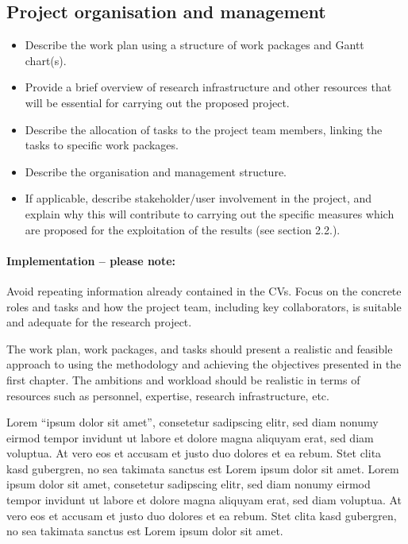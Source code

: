 \documentclass[11pt,a4paper,british]{article}
\begin{document}
\subsection{Project organisation and management}
\begin{itemize}
    \item Describe the work plan using a structure of work packages and Gantt
        chart(s).
    \item Provide a brief overview of research infrastructure and other
        resources that will be essential for carrying out the proposed project.
    \item Describe the allocation of tasks to the project team members, linking
        the tasks to specific work packages.
    \item Describe the organisation and management structure.
    \item If applicable, describe stakeholder/user involvement in the project,
        and explain why this will contribute to carrying out the specific
        measures which are proposed for the exploitation of the results (see
        section 2.2.).
\end{itemize}

\paragraph{Implementation -- please note:}
Avoid repeating information already contained in the CVs. Focus on the concrete
roles and tasks and how the project team, including key collaborators, is
suitable and adequate for the research project.

The work plan, work packages, and tasks should present a realistic and feasible
approach to using the methodology and achieving the objectives presented in the
first chapter. The ambitions and workload should be realistic in terms of
resources such as personnel, expertise, research infrastructure, etc.

\newpage
Lorem \enquote{ipsum dolor sit amet}, consetetur sadipscing elitr, sed diam nonumy eirmod tempor invidunt ut labore et dolore magna aliquyam erat, sed diam voluptua. At vero eos et accusam et justo duo dolores et ea rebum. Stet clita kasd gubergren, no sea takimata sanctus est Lorem ipsum dolor sit amet. Lorem ipsum dolor sit amet, consetetur sadipscing elitr, sed diam nonumy eirmod tempor invidunt ut labore et dolore magna aliquyam erat, sed diam voluptua. At vero eos et accusam et justo duo dolores et ea rebum. Stet clita kasd gubergren, no sea takimata sanctus est Lorem ipsum dolor sit amet.
\end{document}
